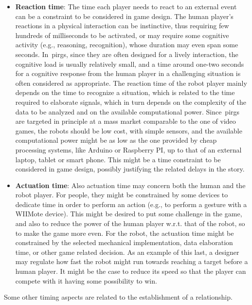 \begin{itemize}
\item \textbf{Reaction time}: The time each player needs to react to an external event can be a constraint to be considered in game design. The human player's reactions in a physical interaction can be instinctive, thus requiring few hundreds of milliseconds to be activated, or may require some cognitive activity (e.g., reasoning, recognition), whose duration may even span some seconds. In~\glspl{pirg}, since they are often designed for a lively interaction, the cognitive load is usually relatively small, and a time around one-two seconds for a cognitive response from the human player in a challenging situation is often considered as appropriate. The reaction time of the robot player mainly depends on the time to recognize a situation, which is related to the time required to elaborate signals, which in turn depends on the complexity of the data to be analyzed and on the available computational power. Since~\glspl{pirg} are targeted in principle at a mass market comparable to the one of video games, the robots should be low cost, with simple sensors, and the available computational power might be as low as the one provided by cheap processing systems, like Arduino or Raspberry PI, up to that of an external laptop, tablet or smart phone. This might be a time constraint to be considered in game design, possibly justifying the related delays in the story.

\item \textbf{Actuation time}: Also actuation time may concern both the human and the robot player. For people, they might be constrained by some devices to dedicate time in order to perform an action (e.g., to perform a gesture with a WIIMote device). This might be desired to put some challenge in the game, and also to reduce the power of the human player w.r.t. that of the robot, so to make the game more even. For the robot, the actuation time might be constrained by the selected mechanical implementation, data elaboration time, or other game related decision. As an example of this last, a designer may regulate how fast the robot might run towards reaching a target before a human player. It might be the case to reduce its speed so that the player can compete with it having some possibility to win.
\end{itemize}

Some other timing aspects are related to the establishment of a relationship.

